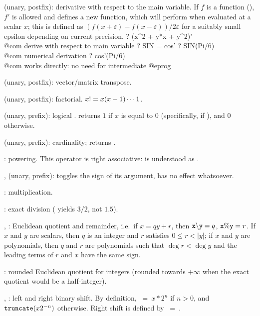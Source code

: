 %
 (unary, postfix): derivative with respect to the main variable.
If $f$ is a function (), $f'$ is allowed and defines a new
function, which will perform  when evaluated
at a scalar $x$; this is defined as $(f(x+\varepsilon) - f(x-\varepsilon)) /
2\varepsilon$ for a suitably small epsilon depending on current precision.
\bprog
? (x^2 + y*x + y^2)'  \\@com derive with respect to main variable 
? SIN = cos'
? SIN(Pi/6)         \\@com numerical derivation
? cos'(Pi/6)        \\@com works directly: no need for intermediate 
@eprog

\strut\kbd{\til} (unary, postfix): vector/matrix transpose.

\kbd{!} (unary, postfix): factorial. $x{\tt !}=x(x-1)\cdots 1$.

\kbd{!} (unary, prefix): logical .  returns $1$ if $x$ is
equal to $0$ (specifically, if ), and $0$ otherwise.

%
\kbd{\#} (unary, prefix): cardinality;  returns .

%
\kbd{\pow}: powering. This operator is right associative:
 is understood as .

%
\kbd{+}, \kbd{-} (unary, prefix): \kbd{-} toggles the sign of its argument,
\kbd{+} has no effect whatsoever.

%
\kbd{*}: multiplication.

\kbd{/}: exact division ( yields $3/2$, not $1.5$).

\kbd{\bs}, \kbd{\%}: Euclidean quotient and remainder, i.e.~if $x =
qy + r$, then $\kbd{x \b{ } y} = q$, ${\tt x\%y} = r$. If $x$ and $y$
are scalars, then $q$ is an integer and $r$ satisfies $0\le r < |y|$; if $x$
and $y$ are polynomials, then $q$ and $r$ are polynomials such that $\deg r<
\deg y$ and the leading terms of $r$ and $x$ have the same sign.

\kbd{\bs/}: rounded Euclidean quotient for integers (rounded towards
$+\infty$ when the exact quotient would be a half-integer).

\kbd{<<}, \kbd{>>}: left and right binary shift. By definition,
$~=~x * 2^n$ if $n>0$, and ${\tt truncate}(x 2^{-n})$ otherwise.
Right shift is defined by $~=~$.


